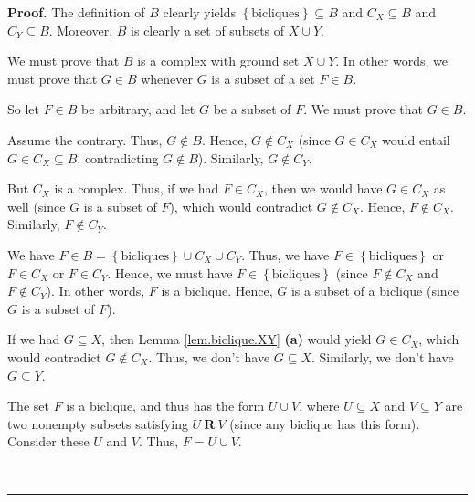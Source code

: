 \documentclass[numbers=enddot,12pt,final,onecolumn,notitlepage]{scrartcl}%
\theoremstyle{definition}
\newenvironment{proof}[1][Proof]{\noindent\textbf{#1.} }{\ \rule{0.5em}{0.5em}}
\newenvironment{verlong}{}{}
\begin{document}
\begin{verlong}


\begin{proof}
The definition of $B$ clearly yields $\left\{  \text{bicliques}\right\}
\subseteq B$ and $C_{X}\subseteq B$ and $C_{Y}\subseteq B$. Moreover, $B$ is
clearly a set of subsets of $X\cup Y$.

We must prove that $B$ is a complex with ground set $X\cup Y$. In other words,
we must prove that $G\in B$ whenever $G$ is a subset of a set $F\in B$.

So let $F\in B$ be arbitrary, and let $G$ be a subset of $F$. We must prove
that $G\in B$.

Assume the contrary. Thus, $G\notin B$. Hence, $G\notin C_{X}$ (since $G\in
C_{X}$ would entail $G\in C_{X}\subseteq B$, contradicting $G\notin B$).
Similarly, $G\notin C_{Y}$.

But $C_{X}$ is a complex. Thus, if we had $F\in C_{X}$, then we would have
$G\in C_{X}$ as well (since $G$ is a subset of $F$), which would contradict
$G\notin C_{X}$. Hence, $F\notin C_{X}$. Similarly, $F\notin C_{Y}$.

We have $F\in B=\left\{  \text{bicliques}\right\}  \cup C_{X}\cup C_{Y}$.
Thus, we have $F\in\left\{  \text{bicliques}\right\}  $ or $F\in C_{X}$ or
$F\in C_{Y}$. Hence, we must have $F\in\left\{  \text{bicliques}\right\}  $
(since $F\notin C_{X}$ and $F\notin C_{Y}$). In other words, $F$ is a
biclique. Hence, $G$ is a subset of a biclique (since $G$ is a subset of $F$).

If we had $G\subseteq X$, then Lemma \ref{lem.biclique.XY} \textbf{(a)} would
yield $G\in C_{X}$, which would contradict $G\notin C_{X}$. Thus, we don't
have $G\subseteq X$. Similarly, we don't have $G\subseteq Y$.

The set $F$ is a biclique, and thus has the form $U\cup V$, where $U\subseteq
X$ and $V\subseteq Y$ are two nonempty subsets satisfying $U\ \mathbf{R}\ V$
(since any biclique has this form). Consider these $U$ and $V$. Thus, $F=U\cup
V$.


\end{proof}
\end{verlong}
\end{document}

